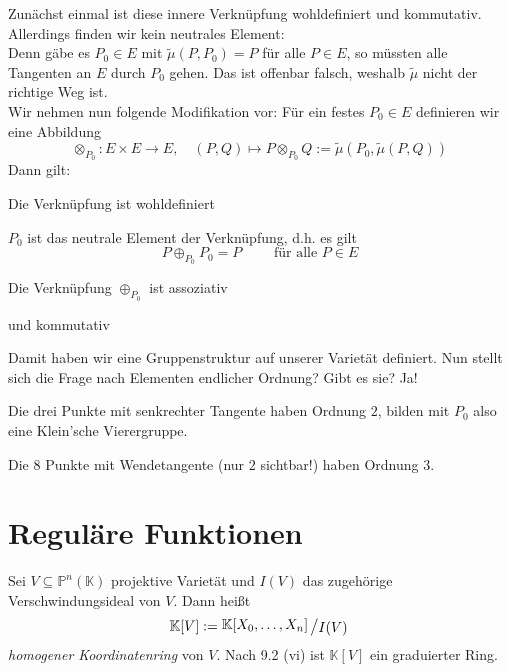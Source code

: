 \documentclass[11pt]{book}
\theoremstyle{nonumberbreak}
\newenvironment{defin}[1][]{\ifthenelse{\equal{#1}{}}{\definition}{\definition[#1]}\rm}{\enddefinition}
\newenvironment{ex}[1][]{\ifthenelse{\equal{#1}{}}{\example}{\example[#1]}\rm}{\endexample}
\newcommand{\slant}[2]{{\raisebox{.1em}{$#1$}\left/\raisebox{-.1em}{$#2$}\right.}}
\begin{document}
\begin{spacing}{1.3}
\begin{ex}
Zunächst einmal ist diese innere Verknüpfung wohldefiniert und kommutativ. Allerdings finden wir kein neutrales Element: \\
Denn gäbe es $P_0 \in E$ mit $\tilde{\mu}(P,P_0)=P$ für alle $P \in E$, so müssten alle Tangenten an $E$ durch $P_0$ gehen. Das ist offenbar falsch, weshalb $\tilde{\mu}$ nicht der richtige Weg ist.\\
Wir nehmen nun folgende Modifikation vor: Für ein festes $P_0 \in E$ definieren wir eine Abbildung
$$\otimes_{P_0}: E \times E \longrightarrow E, \quad (P,Q) \mapsto P \otimes_{P_0} Q := \tilde{\mu}({P_0}, \tilde{\mu}(P,Q))$$
Dann gilt:
\begin{compactenum}
\item Die Verknüpfung ist wohldefiniert
\item $P_{0}$ ist das neutrale Element der Verknüpfung, d.h. es gilt
$$P \oplus_{P_{0}}P_{0} = P \qquad \textrm{ f\"ur alle } P \in E$$
\item Die Verknüpfung $\oplus_{P_{0}}$ ist assoziativ 
\item und kommutativ

\end{compactenum}
Damit haben wir eine Gruppenstruktur auf unserer Varietät definiert.
Nun stellt sich die Frage nach Elementen endlicher Ordnung? Gibt es sie? Ja!
\begin{compactenum}
\item Die drei Punkte mit senkrechter Tangente haben Ordnung $2$, bilden mit $P_{0}$ also eine Klein'sche Vierergruppe.
\item Die $8$ Punkte mit Wendetangente (nur $2$ sichtbar!) haben Ordnung $3$.
\end{compactenum}
\end{ex}




\renewcommand*\thesection{§ \arabic{section}\quad}
\section{Reguläre Funktionen} %
\renewcommand*\thesection{\arabic{section}}

\begin{defin} %
Sei $V \subseteq \mathbb{P}^{n}(\mathbb{K})$ projektive Varietät und $I(V)$ das zugehörige Verschwindungsideal von $V$. Dann heißt
$$\mathbb{K}[V]:= \slant{\mathbb{K}[X_{0}, \ldots, X_{n}]}{I(V)}$$
\textit{homogener Koordinatenring} von $V$. Nach 9.2 (vi) ist $\mathbb{K}[V]$ ein graduierter Ring.
\end{defin}


\end{spacing}
\end{document}
